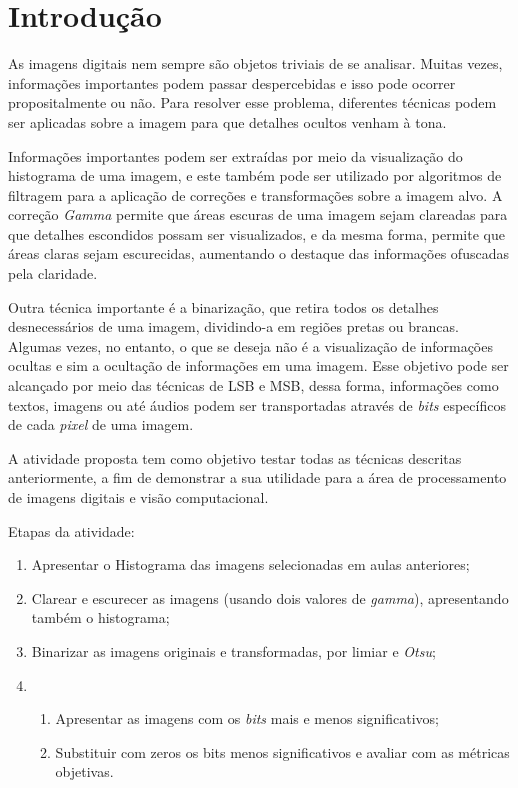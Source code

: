 \chapter[Introdução]{Introdução}

As imagens digitais nem sempre são objetos triviais de se analisar. Muitas vezes, informações importantes podem passar despercebidas e isso pode ocorrer propositalmente ou não. Para resolver esse problema, diferentes técnicas podem ser aplicadas sobre a imagem para que detalhes ocultos venham à tona.

Informações importantes podem ser extraídas por meio da visualização do histograma de uma imagem, e este também pode ser utilizado por algoritmos de filtragem para a aplicação de correções e transformações sobre a imagem alvo. A correção \textit{Gamma} permite que áreas escuras de uma imagem sejam clareadas para que detalhes escondidos possam ser visualizados, e da mesma forma, permite que áreas claras sejam escurecidas, aumentando o destaque das informações ofuscadas pela claridade.

Outra técnica importante é a binarização, que retira todos os detalhes desnecessários de uma imagem, dividindo-a em regiões pretas ou brancas. Algumas vezes, no entanto, o que se deseja não é a visualização de informações ocultas e sim a ocultação de informações em uma imagem. Esse objetivo pode ser alcançado por meio das técnicas de LSB e MSB, dessa forma, informações como textos, imagens ou até áudios podem ser transportadas através de \textit{bits} específicos de cada \textit{pixel} de uma imagem.

A atividade proposta tem como objetivo testar todas as técnicas descritas anteriormente, a fim de demonstrar a sua utilidade para a área de processamento de imagens digitais e visão computacional.


Etapas da atividade:

\begin{enumerate}
    \item Apresentar o Histograma das imagens selecionadas em aulas anteriores;
    \item Clarear e escurecer as imagens (usando dois valores de \textit{gamma}), apresentando também o histograma;
    \item Binarizar as imagens originais e transformadas, por limiar e \textit{Otsu};
    \item \begin{enumerate}
        \item Apresentar as imagens com os \textit{bits} mais e menos significativos;
        \item Substituir com zeros os bits menos significativos e avaliar com as métricas objetivas.
    \end{enumerate}
\end{enumerate}

